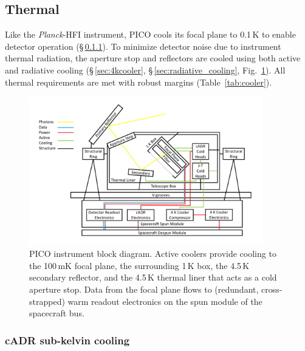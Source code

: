 \subsection{Thermal}
\label{sec:thermal} %

Like the \textit{Planck}-HFI instrument, PICO cools its focal plane to
0.1\,K to enable detector operation (\S\,\ref{sec:cadr}). To minimize
detector noise due to instrument thermal radiation, the aperture
stop and reflectors are cooled using both active and radiative cooling
(\S\,\ref{sec:4kcooler}, \S\,\ref{sec:radiative_cooling}, Fig.~\ref{fig:ArchitectureBlockDiagram}).  All
thermal requirements are met with robust margins
(Table~\ref{tab:cooler}).



\begin{figure}[ht]
\parbox{4.0in}{
\includegraphics[width=4.0in]{images/ArchitectureBlockDiagram.png} }
\hspace{0.05in}
\parbox{2.45in}{
\caption{\captiontext 
PICO instrument block diagram. Active coolers provide cooling
  to the 100\,mK focal plane, the surrounding 1\,K box, the 4.5\,K secondary reflector, and the
  4.5\,K thermal liner that acts as a cold aperture stop. Data from the focal
  plane flows to (redundant, cross-strapped) warm readout electronics
  on the spun module of the spacecraft
  bus.\label{fig:ArchitectureBlockDiagram} }  }
\end{figure}


\subsubsection{cADR sub-kelvin cooling}
\label{sec:cadr} %

